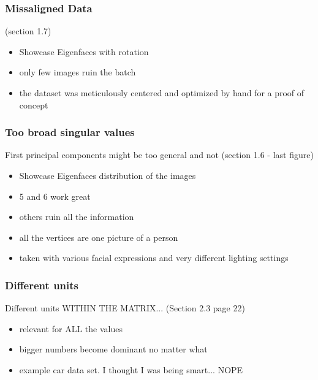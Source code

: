 \subsubsection{Missaligned Data}

\cite{brunton2019data} (section 1.7)

\begin{itemize}
	\item Showcase Eigenfaces with rotation
	\item only few images ruin the batch
	\item the dataset was meticulously centered and optimized by hand for a proof of concept
\end{itemize}

\clearpage




\subsubsection{Too broad singular values}

First principal components might be too general and not \cite{brunton2019data} (section 1.6 - last figure)

\begin{itemize}
	\item Showcase Eigenfaces distribution of the images
	\item 5 and 6 work great
	\item others ruin all the information
	\item all the vertices are one picture of a person
	\item taken with various facial expressions and very different lighting settings
\end{itemize}


\clearpage





\subsubsection{Different units}

Different units WITHIN THE MATRIX... \cite{Jolliffe2002book} (Section 2.3 page 22)

\begin{itemize}
	\item relevant for ALL the values
	\item bigger numbers become dominant no matter what
	\item example car data set. I thought I was being smart... NOPE
\end{itemize}

\clearpage
